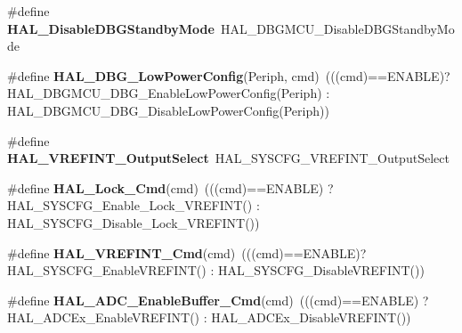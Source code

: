 \begin{DoxyCompactItemize}
\item 
\hypertarget{group___h_a_l___aliased___functions_gac17bfe5c0df5508f778b7f3784b9723a}{\#define {\bfseries H\-A\-L\-\_\-\-Disable\-D\-B\-G\-Standby\-Mode}~H\-A\-L\-\_\-\-D\-B\-G\-M\-C\-U\-\_\-\-Disable\-D\-B\-G\-Standby\-Mode}\label{group___h_a_l___aliased___functions_gac17bfe5c0df5508f778b7f3784b9723a}

\item 
\hypertarget{group___h_a_l___aliased___functions_gaeece8fd3268534ce330c635222ce79a3}{\#define {\bfseries H\-A\-L\-\_\-\-D\-B\-G\-\_\-\-Low\-Power\-Config}(Periph, cmd)~(((cmd)==E\-N\-A\-B\-L\-E)? H\-A\-L\-\_\-\-D\-B\-G\-M\-C\-U\-\_\-\-D\-B\-G\-\_\-\-Enable\-Low\-Power\-Config(Periph) \-: H\-A\-L\-\_\-\-D\-B\-G\-M\-C\-U\-\_\-\-D\-B\-G\-\_\-\-Disable\-Low\-Power\-Config(Periph))}\label{group___h_a_l___aliased___functions_gaeece8fd3268534ce330c635222ce79a3}

\item 
\hypertarget{group___h_a_l___aliased___functions_ga2c3d2cdc9071cfc99696e78c29621852}{\#define {\bfseries H\-A\-L\-\_\-\-V\-R\-E\-F\-I\-N\-T\-\_\-\-Output\-Select}~H\-A\-L\-\_\-\-S\-Y\-S\-C\-F\-G\-\_\-\-V\-R\-E\-F\-I\-N\-T\-\_\-\-Output\-Select}\label{group___h_a_l___aliased___functions_ga2c3d2cdc9071cfc99696e78c29621852}

\item 
\hypertarget{group___h_a_l___aliased___functions_ga72384357565be710258691efd3b3b72c}{\#define {\bfseries H\-A\-L\-\_\-\-Lock\-\_\-\-Cmd}(cmd)~(((cmd)==E\-N\-A\-B\-L\-E) ? H\-A\-L\-\_\-\-S\-Y\-S\-C\-F\-G\-\_\-\-Enable\-\_\-\-Lock\-\_\-\-V\-R\-E\-F\-I\-N\-T() \-: H\-A\-L\-\_\-\-S\-Y\-S\-C\-F\-G\-\_\-\-Disable\-\_\-\-Lock\-\_\-\-V\-R\-E\-F\-I\-N\-T())}\label{group___h_a_l___aliased___functions_ga72384357565be710258691efd3b3b72c}

\item 
\hypertarget{group___h_a_l___aliased___functions_ga89195eed3652b3f7ce36e89f3cc8e3a6}{\#define {\bfseries H\-A\-L\-\_\-\-V\-R\-E\-F\-I\-N\-T\-\_\-\-Cmd}(cmd)~(((cmd)==E\-N\-A\-B\-L\-E)? H\-A\-L\-\_\-\-S\-Y\-S\-C\-F\-G\-\_\-\-Enable\-V\-R\-E\-F\-I\-N\-T() \-: H\-A\-L\-\_\-\-S\-Y\-S\-C\-F\-G\-\_\-\-Disable\-V\-R\-E\-F\-I\-N\-T())}\label{group___h_a_l___aliased___functions_ga89195eed3652b3f7ce36e89f3cc8e3a6}

\item 
\hypertarget{group___h_a_l___aliased___functions_ga2945c26e7b184a3ee89309906de33cd3}{\#define {\bfseries H\-A\-L\-\_\-\-A\-D\-C\-\_\-\-Enable\-Buffer\-\_\-\-Cmd}(cmd)~(((cmd)==E\-N\-A\-B\-L\-E) ? H\-A\-L\-\_\-\-A\-D\-C\-Ex\-\_\-\-Enable\-V\-R\-E\-F\-I\-N\-T() \-: H\-A\-L\-\_\-\-A\-D\-C\-Ex\-\_\-\-Disable\-V\-R\-E\-F\-I\-N\-T())}\label{group___h_a_l___aliased___functions_ga2945c26e7b184a3ee89309906de33cd3}


\end{DoxyCompactItemize}
